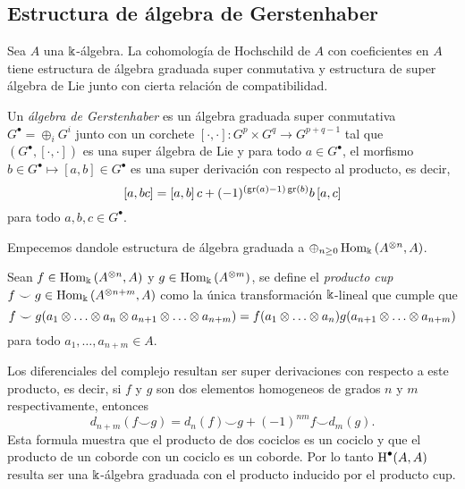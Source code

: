 \documentclass[a4paper,oneside,fleqn,11pt,../tesis.tex]{subfiles}
\begin{document}
\subsection{Estructura de álgebra de Gerstenhaber}

Sea $A$ una $\Bbbk$-álgebra. La cohomología de Hochschild de $A$ con coeficientes en $A$ tiene estructura
de álgebra graduada super conmutativa y estructura de super álgebra de Lie junto con cierta relación de compatibilidad.

\begin{definition}
	Un \emph{álgebra de Gerstenhaber} es un álgebra graduada super conmutativa $G^{\bullet} = \oplus_{i}G^i$ junto con
	un corchete $\left[\cdot, \cdot \right]: G^{p} \times G^{q} \to G^{p + q - 1}$
	tal que $\left(G^{\bullet}, \left[\cdot, \cdot \right]\right)$ es una super álgebra de Lie y para todo $a \in G^{\bullet}$,
	el morfismo $b \in G^{\bullet} \mapsto \left[a,b\right] \in G^{\bullet}$
	es una super derivación con respecto al producto, es decir,
	\[
		\left[a, b c\right] = \left[a,b\right]c + (-1)^{(\operatorname{gr}(a) - 1)\operatorname{gr}(b)}b\left[a, c\right]
	\]
	para todo $a, b, c \in G^{\bullet}$.
\end{definition}

Empecemos dandole estructura de álgebra graduada a $\oplus_{n \geq 0}\operatorname{Hom}_{\Bbbk}\left(A^{\otimes n}, A\right)$.
\begin{definition}
	Sean $f \in \operatorname{Hom}_{\Bbbk}\left(A^{\otimes n}, A\right)$ y $g \in \operatorname{Hom}_{\Bbbk}\left(A^{\otimes m}\right)$, se define el \emph{producto cup}
	$f \smile g \in \operatorname{Hom}_{\Bbbk}\left(A^{\otimes n + m}, A\right)$ como la única transformación $\Bbbk$-lineal que cumple que
	\[
		f\smile g(a_1\otimes \ldots \otimes a_n \otimes a_{n + 1} \otimes \ldots \otimes a_{n + m}) = f(a_1\otimes \ldots \otimes a_n)g(a_{n + 1} \otimes \ldots \otimes a_{n + m})
	\]
	para todo $a_1, \ldots, a_{n + m} \in A$.
\end{definition}
Los diferenciales del complejo resultan ser super derivaciones con respecto a este producto, es decir, si $f$ y $g$ son dos
elementos homogeneos de grados $n$ y $m$ respectivamente, entonces
\[
	d_{n + m}(f \smile g) = d_{n}(f) \smile g + (-1)^{nm}f \smile d_{m}(g).
\]
Esta formula muestra que el producto de dos cociclos es un cociclo y que el producto de un coborde con un cociclo
es un coborde. Por lo tanto $\operatorname{H}^{\bullet}(A,A)$ resulta ser una $\Bbbk$-álgebra graduada con el producto inducido por el producto cup.
\end{document}

